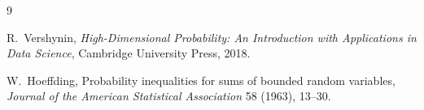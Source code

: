 \documentclass[11pt]{article}
\theoremstyle{definition}
\newcommand{\Wb}{\mathbf{W}}
\newcommand{\eps}{\varepsilon}
\newcommand{\Hop}{H_{\mathrm{op}}}
\begin{document}


\begin{thebibliography}{9}

R.~Vershynin,
\emph{High-Dimensional Probability: An Introduction with Applications in
Data Science}, Cambridge University Press, 2018.

W.~Hoeffding,
Probability inequalities for sums of bounded random variables,
\emph{Journal of the American Statistical Association} 58 (1963), 13--30.

\end{thebibliography}
\end{document}
